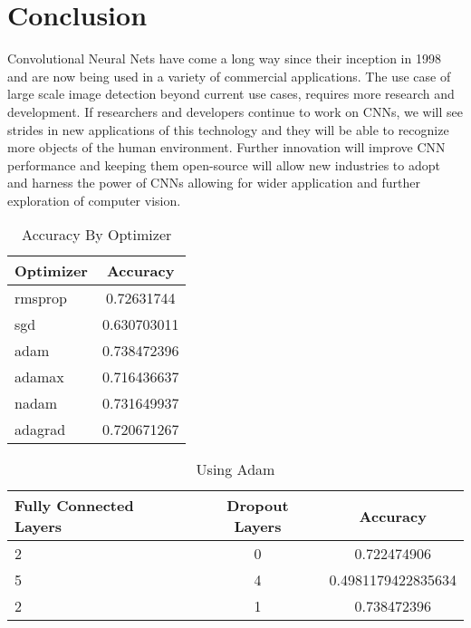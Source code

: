 \documentclass[12pt,english]{article}
\begin{document}
\section{Conclusion}
Convolutional Neural Nets have come a long way since their inception in 1998 and are now being used in a variety of commercial applications. The use case of large scale image detection beyond current use cases, requires more research and development. If researchers and developers continue to work on CNNs, we will see strides in new applications of this technology and they will be able to recognize more objects of the human environment. Further innovation will improve CNN performance and keeping them open-source will allow new industries to adopt and harness the power of CNNs allowing for wider application and further exploration of computer vision. 

\pagebreak{}

\begin{spacing}{1.0}


\end{spacing}

\vfill
\pagebreak{}
\clearpage








\begin{table}
\begin{center}
\begin{tabular}{l | c }
Optimizer & Accuracy\\
\hline \hline
rmsprop & 0.72631744  \\ 
sgd & 0.630703011\\
adam & 0.738472396\\
adamax &  0.716436637\\
nadam &  0.731649937\\ 
adagrad &  0.720671267\\ 
\end{tabular}
\caption{Accuracy By Optimizer}
\end{center}
\end{table}

\begin{table}
\begin{center}
\begin{tabular}{l | c | c}
Fully Connected Layers & Dropout Layers & Accuracy\\
\hline \hline
2 & 0 & 0.722474906\\ 
5 & 4 & 0.4981179422835634\\
2 & 1 & 0.738472396\\
\end{tabular}
\caption{Using Adam}
\end{center}
\end{table}
\end{document}
